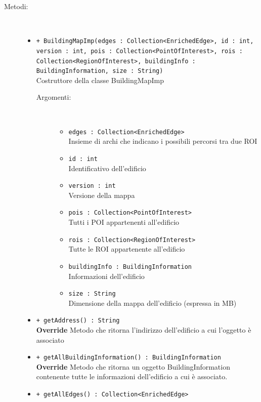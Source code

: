 \documentclass[../DefinizioneDiProdotto.tex]{subfiles}
\begin{document}
\begin{description}
\begin{itemize}
	\end{itemize}
	\item[Metodi:] \
	\begin{itemize}
		\item \texttt{+ BuildingMapImp(edges : Collection<EnrichedEdge>, id : int, version : int, pois : Collection<PointOfInterest>, rois : Collection<RegionOfInterest>, buildingInfo : BuildingInformation, size : String)}\\
		Costruttore della classe BuildingMapImp
		\begin{description}
			\item[Argomenti:] \
			\begin{itemize}
				\item \texttt{edges : Collection<EnrichedEdge>}\\
				Insieme di archi che indicano i possibili percorsi tra due ROI\item \texttt{id : int}\\
				Identificativo dell'edificio\item \texttt{version : int}\\
				Versione della mappa\item \texttt{pois : Collection<PointOfInterest>}\\
				Tutti i POI appartenenti all'edificio\item \texttt{rois : Collection<RegionOfInterest>}\\
				Tutte le ROI appartenente all'edificio\item \texttt{buildingInfo : BuildingInformation}\\
				Informazioni dell'edificio\item \texttt{size : String}\\
				Dimensione della mappa dell'edificio (espressa in MB)\end{itemize}
		\end{description}
		\item \texttt{+ getAddress() : String}\\
		\textbf{Override} Metodo che ritorna l'indirizzo dell'edificio a cui l'oggetto è associato
		\item \texttt{+ getAllBuildingInformation() : BuildingInformation}\\
		\textbf{Override} Metodo che ritorna un oggetto BuildingInformation contenente tutte le informazioni dell'edificio a cui è associato.
		\item \texttt{+ getAllEdges() : Collection<EnrichedEdge>}\\

\end{itemize}
\end{description}
\end{document}
